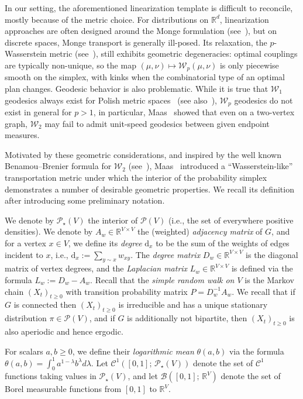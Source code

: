 \documentclass[11pt,a4paper]{article}
\newcommand{\Wass}{\mathcal{W}}
\newcommand{\Prob}{\mathscr{P}}
\newcommand{\Deg}{\mathrm{d}}
\begin{document}
In our setting, the aforementioned linearization template is difficult to reconcile, mostly because of the metric choice. For distributions on $\mathbb{R}^{d}$, linearization approaches are often designed around the Monge formulation (see~), but on discrete spaces, Monge transport is generally ill-posed. Its relaxation, the $p$-Wasserstein metric (see~), still exhibits geometric degeneracies: optimal couplings are typically non-unique, so the map $(\mu,\nu)\mapsto \Wass_p(\mu,\nu)$ is only piecewise smooth on the simplex, with kinks when the combinatorial type of an optimal plan changes. Geodesic behavior is also problematic. While it is true that $\Wass_1$ geodesics always exist for Polish metric spaces~\cite[Theorem 5.1]{bottou2018geometrical} (see also~\cite{hillion2014interpolation}), $\Wass_p$ geodesics do not exist in general for $p>1$, in particular, Maas~\cite{maas2011gradient} showed that even on a two-vertex graph, $\Wass_2$ may fail to admit unit-speed geodesics between given endpoint measures. 

Motivated by these geometric considerations, and inspired by the well known Benamou--Brenier formula for $\Wass_2$ (see~\cite{benamou2000computational}), Maas~\cite{maas2011gradient} introduced a ``Wasserstein-like'' transportation metric under which the interior of the probability simplex demonstrates a number of desirable geometric properties. We recall its definition after introducing some preliminary notation.

We denote by $\Prob_\star(V)$ the interior of $\Prob(V)$ (i.e., the set of everywhere positive densities). We denote by $A_{w}\in\mathbb{R}^{V\times V}$ the (weighted) \emph{adjacency matrix} of $G$, and for a vertex $x\in V$, we define its \emph{degree} $\Deg_{x}$ to be the sum of the weights of edges incident to $x$, i.e., $\Deg_{x} := \sum_{y\sim x} w_{xy}$. The \emph{degree matrix} $D_{w}\in\mathbb{R}^{V\times V}$ is the diagonal matrix of vertex degrees, and the \emph{Laplacian matrix} $L_{w}\in\mathbb{R}^{V\times V}$ is defined via the formula $L_{w} := D_{w} - A_{w}$. Recall that the \emph{simple random walk on $V$} is the Markov chain $(X_t)_{t\geq 0}$ with transition probability matrix $P=D_w^{-1} A_{w}$. We recall that if $G$ is connected then $(X_t)_{t\geq 0}$ is irreducible and has a unique stationary distribution $\pi\in\Prob(V)$, and if $G$ is additionally not bipartite, then $(X_t)_{t\geq 0}$ is also aperiodic and hence ergodic.

For scalars $a, b\geq 0$, we define their \emph{logarithmic mean} $\theta(a, b)$ via the formula $\theta(a, b) = \int_0^1 a^{1-\lambda} b^{\lambda} d\lambda$. Let $\mathcal{C}^1([0, 1];\, \Prob_\star(V))$ denote the set of $\mathcal{C}^{1}$ functions taking values in $\Prob_\star(V)$, and let $\mathcal{B}([0, 1];\, \mathbb{R}^{V})$ denote the set of Borel measurable functions from $[0, 1]$ to $\mathbb{R}^{V}$.
\end{document}
